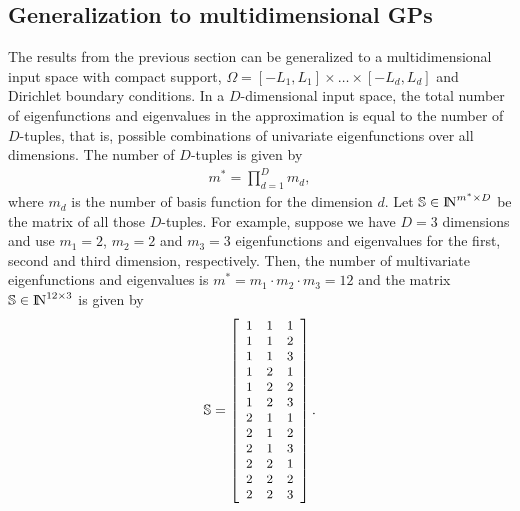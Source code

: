 \documentclass[onecolumn,a4paper,11pt]{article}
\begin{document}
\subsection{Generalization to multidimensional GPs} \label{ch5_sec_method_multi}

The results from the previous section can be generalized to a multidimensional input space with compact support, $\Omega=[-L_1,L_1] \times \dots \times [-L_d,L_d]$ and Dirichlet boundary conditions. 
In a $D$-dimensional input space, the total number of eigenfunctions and eigenvalues in the approximation is equal to the number of $D$-tuples, that is, possible combinations of univariate eigenfunctions over all dimensions. The number of $D$-tuples is given by 
%
\begin{align} \label{eq_m_multi}
m^{\ast} = \prod_{d=1}^{D} m_d,
\end{align}
%
where $m_d$ is the number of basis function for the dimension $d$. Let $\mathbb{S}\in {\rm I\!N}^{m^{\ast} \times D}$ be the matrix of all those $D$-tuples. For example, suppose we have $D=3$ dimensions and use $m_{1}=2$, $m_{2}=2$ and $m_{3}=3$ eigenfunctions and eigenvalues for the first, second and third dimension, respectively. Then, the number of multivariate eigenfunctions and eigenvalues is $m^{\ast} = m_{1} \cdot m_{2} \cdot m_{3} = 12$ and the matrix $\mathbb{S}\in {\rm I\!N}^{12 \times 3}$ is given by
%
\begin{align}\small
\mathbb{S}=
\left[ {\begin{array}{ccc}
1 & 1 & 1 \nonumber \\
1 & 1 & 2 \\
1 & 1 & 3 \\
1 & 2 & 1 \\
1 & 2 & 2 \\
1 & 2 & 3 \\
2 & 1 & 1 \\
2 & 1 & 2 \\
2 & 1 & 3 \\
2 & 2 & 1 \\
2 & 2 & 2 \\
2 & 2 & 3 
\end{array} } \right].
\end{align} 
\end{document}
